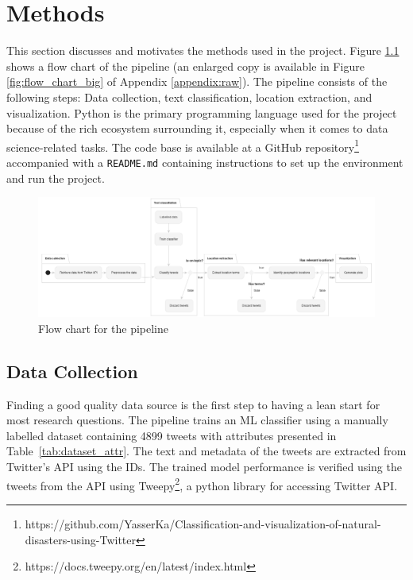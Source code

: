 \chapter{Methods}

This section discusses and motivates the methods used in the project. Figure \ref{fig:flow_chart}
shows a flow chart of the pipeline (an enlarged copy is available in Figure \ref{fig:flow_chart_big}
of Appendix \ref{appendix:raw}). The pipeline consists of the following steps: Data collection, text
classification, location extraction, and visualization. Python is the primary programming language
used for the project because of the rich ecosystem surrounding it, especially when it comes to data
science-related tasks. The code base is available at a GitHub
repository\footnote{https://github.com/YasserKa/Classification-and-visualization-of-natural-disasters-using-Twitter}
accompanied with a \texttt{README.md} containing instructions to set up the environment and run the
project.

\begin{figure}[H]
\begin{center}
  \includegraphics[width=\columnwidth]{./images/pipeline.png}
\end{center}
\caption{Flow chart for the pipeline}
\label{fig:flow_chart}
\end{figure}

\section{Data Collection}

Finding a good quality data source is the first step to having a lean start for most research
questions. The pipeline trains an \ac{ML} classifier using a manually labelled dataset containing
4899 tweets with attributes presented in Table~\ref{tab:dataset_attr}. The text and metadata of the tweets are extracted
from Twitter's API using the IDs. The trained model performance is verified using the tweets from
the API using Tweepy\footnote{https://docs.tweepy.org/en/latest/index.html}, a python library for
accessing Twitter API.


